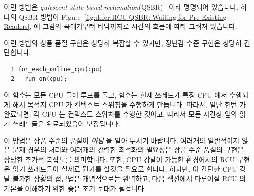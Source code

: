 이런 방법은 \emph{quiescent state based
reclamation}(QSBR)~\cite{ThomasEHart2006a} 이라 명명되어 있습니다.
하나의 QSBR 방법이
Figure~\ref{fig:defer:RCU QSBR: Waiting for Pre-Existing Readers},
에 그림의 꼭대기부터
바닥까지로 시간의 흐름에 따라 그려져 있습니다.

이런 방법의 상품 품질 구현은 상당히 복잡할 수 있지만, 장난감 수준 구현은 상당히
간단합니다:

\vspace{5pt}
\begin{minipage}[t]{\columnwidth}
\scriptsize
\begin{verbatim}
  1 for_each_online_cpu(cpu)
  2   run_on(cpu);
\end{verbatim}
\end{minipage}
\vspace{5pt}

이  함수는 모든 CPU 들에 루프를 돌고, 
함수는 현재 쓰레드가 특정 CPU 에서 수행되게 해서 목적지 CPU 가 컨텍스트
스위칭을 수행하게 만듭니다.
따라서, 일단 한번  가 완료되면, 각 CPU 는 컨텍스트
스위치를 수행한 것이고, 따라서 모든 시간상 앞의 읽기 쓰레드들은 완료되었음이
보장됩니다.

이 방법은 상품 수준의 품질이 \emph{아님} 을 알아 두시기 바랍니다.
여러개의 일반적이지 않은 문제 경우의 처리와 여러개의 강력한 최적화의 필요성은
상품 수준 품질의 구현은 상당한 추가적 복잡도를 의미합니다.
또한, CPU 강탈이 가능한 환경에서의 RCU 구현은 읽기 쓰레드들이 실제로 뭔가를
할것을 필요로 합니다.
하지만, 이 간단한 CPU 강탈 불가한 상황의 접근법은 개념적으로는 완벽하고, 다음
섹션에서 다루어질 RCU 의 기본을 이해하기 위한 좋은 초기 토대가 될겁니다.

